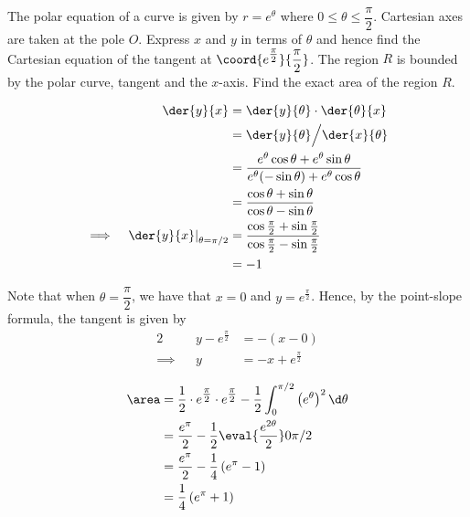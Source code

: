 \documentclass{jhwhw}
\begin{document}

    \problem{}
        The polar equation of a curve is given by $r = e^\theta$ where $0 \leq \theta \leq \dfrac\pi2$. Cartesian axes are taken at the pole $O$. Express $x$ and $y$ in terms of $\theta$ and hence find the Cartesian equation of the tangent at $\coord{e^{\tfrac\pi2}}{\dfrac\pi2}$. The region $R$ is bounded by the polar curve, tangent and the $x$-axis. Find the exact area of the region $R$.

    \solution

        \begin{alignat*}{2}
            &&\der{y}{x} &= \der{y}{\theta} \cdot \der{\theta}{x}\\
            && &= \der{y}{\theta} \Big/ \der{x}{\theta}\\
            && &= \dfrac{e^\theta \cos\theta + e^\theta\sin\theta}{e^\theta(-\sin\theta) + e^\theta \cos\theta}\\
            && &= \dfrac{\cos\theta + \sin\theta}{\cos\theta - \sin\theta}\\
            \implies&&\left.\der{y}{x}\right|_{\theta = \pi/2} &= \dfrac{\cos\tfrac\pi2 + \sin\tfrac\pi2 }{\cos\tfrac\pi2 - \sin\tfrac\pi2 }\\
            && &= -1
        \end{alignat*}

        Note that when $\theta = \dfrac\pi2$, we have that $x = 0$ and $y = e^{\tfrac\pi2}$. Hence, by the point-slope formula, the tangent is given by
        \begin{alignat*}{2}
            &&y - e^{\tfrac\pi2} &= -(x - 0)\\
            \implies&&y &= -x + e^{\tfrac\pi2}
        \end{alignat*}


        \begin{align*}
            \area &= \dfrac12 \cdot e^{\tfrac\pi2} \cdot e^{\tfrac\pi2} - \dfrac12 \int_0^{\pi/2} \left(e^\theta\right)^2 \d \theta\\
            &= \dfrac{e^\pi}2 - \dfrac12 \eval{\dfrac{e^{2\theta}}2}0{\pi/2}\\
            &= \dfrac{e^\pi}2 - \dfrac14 \left(e^\pi - 1\right)\\
            &= \dfrac14 \left(e^\pi + 1\right)
        \end{align*}
\end{document}
